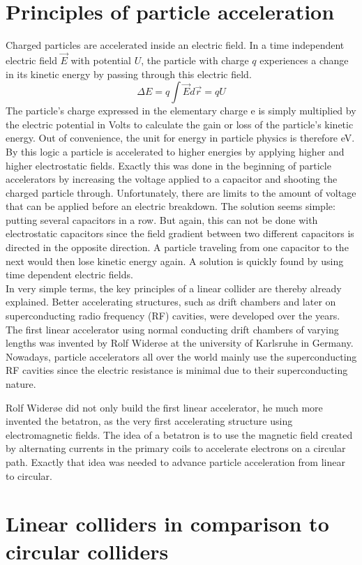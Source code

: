 \section{Principles of particle acceleration}
\label{AcceleratorPhysics}
Charged particles are accelerated inside an electric field. 
In a time independent electric field $\vec{E}$ with potential $U$, the particle with charge $q$ experiences a change in its kinetic energy by passing through this electric field.
\begin{equation}
 \Delta E = q \int \vec{E}d\vec{r} = qU
\end{equation}
The particle's charge expressed in the elementary charge e is simply multiplied by the electric potential in Volts to calculate the gain or loss of the particle's kinetic energy. 
Out of convenience, the unit for energy in particle physics is therefore eV.\\
By this logic a particle is accelerated to higher energies by applying higher and higher electrostatic fields. 
Exactly this was done in the beginning of particle accelerators by increasing the voltage applied to a capacitor and shooting the charged particle through. 
Unfortunately, there are limits to the amount of voltage that can be applied before an electric breakdown.
The solution seems simple: putting several capacitors in a row.
But again, this can not be done with electrostatic capacitors since the field gradient between two different capacitors is directed in the opposite direction.
A particle traveling from one capacitor to the next would then lose kinetic energy again.
A solution is quickly found by using time dependent electric fields.\\
In very simple terms, the key principles of a linear collider are thereby already explained.
Better accelerating structures, such as drift chambers and later on superconducting radio frequency (RF) cavities, were developed over the years.
The first linear accelerator using normal conducting drift chambers of varying lengths was invented by Rolf Wider\o e at the university of Karlsruhe in Germany.
Nowadays, particle accelerators all over the world mainly use the superconducting RF cavities since the electric resistance is minimal due to their superconducting nature.

Rolf Wider\o e did not only build the first linear accelerator, he much more invented the betatron, as the very first accelerating structure using electromagnetic fields.
The idea of a betatron is to use the magnetic field created by alternating currents in the primary coils to accelerate electrons on a circular path.
Exactly that idea was needed to advance particle acceleration from linear to circular.

\section{Linear colliders in comparison to circular colliders}
\label{Linear-Circular}
